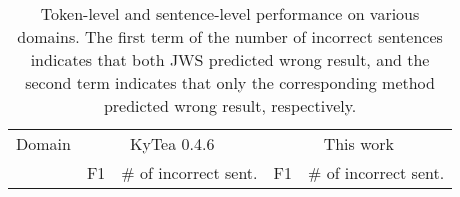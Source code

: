 \documentclass[11pt,letterpaper]{article}
\begin{document}
\begin{table*}[t]   
                                                                                                                                                                                                                                                                                                
 \begin{center}                                                                                                                                                                                                                                                                                                             
\caption{Token-level and sentence-level performance on various domains. The first term of the number of incorrect sentences indicates that both JWS predicted wrong result, and the second term indicates that only the corresponding method predicted wrong result, respectively. }                                                                                                                                                                                                                                                                                 
\label{error}                                                                                                                                                                                                                                                                                                              
 \begin{tabular}{p{53mm}|r|r|r|r}                                                                                                                                  
  \toprule                                                                                                                                                    
        \multicolumn{1}{c|}{Domain} & \multicolumn{2}{c|}{KyTea 0.4.6} & \multicolumn{2}{c}{This work} \\   \cline{2-5}
        \multicolumn{1}{c|}{} & \multicolumn{1}{c|}{F1} & \multicolumn{1}{c|}{\# of incorrect sent.} & \multicolumn{1}{c|}{F1} & \multicolumn{1}{c}{\# of incorrect sent.} \\   

\end{tabular}
\end{center}
\end{table*}
\end{document}
